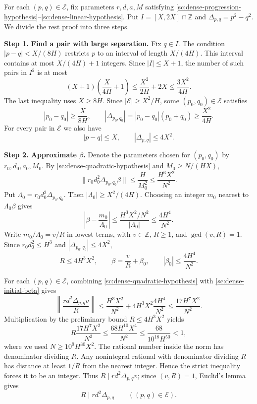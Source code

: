 \documentclass[twoside]{aomart}
\makeatletter
\theoremstyle{paperplain}
\theoremstyle{paperdefinition}
\renewenvironment{proof}[1][\proofname]{\par\pushQED{\qed}%
  \normalfont\topsep6\p@\@plus3\p@\relax\trivlist
  \item[\hskip\labelsep\itshape #1\@addpunct{.}]\ignorespaces
}{\popQED\endtrivlist\@endpefalse}
\numberwithin{equation}{section}
\makeatother
\begin{document}
\begin{proof}
For each $(p,q)\in\mathcal E$, fix parameters $r,d,a,M$ satisfying
\eqref{sc:dense-progression-hypothesis}--\eqref{sc:dense-linear-hypothesis}.
Put $I=[X,2X]\cap\mathbb Z$ and $\Delta_{p,q}=p^2-q^2$. We divide the rest proof into three steps.

\par
\medskip
\noindent\textbf{Step 1. Find a pair with large separation.}
Fix $q\in I$. The condition $|p-q|<X/(8H)$ restricts $p$ to an
interval of length $X/(4H)$. This interval contains at most
$X/(4H)+1$ integers. Since $|I|\le X+1$, the number of such pairs
in $I^2$ is at most
\[
 (X+1)\left(\frac X{4H}+1\right)
 \le \frac{X^2}{2H}+2X
 \le \frac{3X^2}{4H}.
\]
The last inequality uses $X\ge8H$. Since
$|\mathcal E|\ge X^2/H$, some $(p_0,q_0)\in\mathcal E$ satisfies
\begin{equation}
 |p_0-q_0|\ge\frac{X}{8H},
 \qquad
 |\Delta_{p_0,q_0}|
 =|p_0-q_0|(p_0+q_0)\ge\frac{X^2}{4H}.
 \label{sc:dense-far-pair}
\end{equation}
For every pair in $\mathcal E$ we also have
\[
 |p-q|\le X,
 \qquad
 |\Delta_{p,q}|\le4X^2.
\]

\par
\medskip
\noindent\textbf{Step 2. Approximate $\beta$.}
Denote the parameters chosen for $(p_0,q_0)$ by
$r_0,d_0,a_0,M_0$. By \eqref{sc:dense-quadratic-hypothesis} and
$M_0\ge N/(HX)$,
\[
 \|r_0d_0^2\Delta_{p_0,q_0}\beta\|
 \le \frac{H}{M_0^2}
 \le \frac{H^3X^2}{N^2}.
\]
Put
$\Lambda_0=r_0d_0^2\Delta_{p_0,q_0}$. Then
$|\Lambda_0|\ge X^2/(4H)$. Choosing an integer $m_0$ nearest to
$\Lambda_0\beta$ gives
\[
 \left|\beta-\frac{m_0}{\Lambda_0}\right|
 \le \frac{H^3X^2/N^2}{|\Lambda_0|}
 \le \frac{4H^4}{N^2}.
\]
Write $m_0/\Lambda_0=v/R$ in lowest terms, with $v\in\mathbb Z$,
$R\ge1$, and $\gcd(v,R)=1$. Since $r_0d_0^2\le H^3$ and
$|\Delta_{p_0,q_0}|\le4X^2$,
\begin{equation}
 R\le4H^3X^2,
 \qquad
 \beta=\frac vR+\beta_0,
 \qquad
 |\beta_0|\le\frac{4H^4}{N^2}.
 \label{sc:dense-initial-beta}
\end{equation}

For each $(p,q)\in\mathcal E$, combining
\eqref{sc:dense-quadratic-hypothesis} with
\eqref{sc:dense-initial-beta} gives
\[
 \left\|\frac{rd^2\Delta_{p,q}v}{R}\right\|
 \le \frac{H^3X^2}{N^2}
      +4H^3X^2\frac{4H^4}{N^2}
 \le \frac{17H^7X^2}{N^2}.
\]
Multiplication by the preliminary bound $R\le4H^3X^2$ yields
\[
 R\frac{17H^7X^2}{N^2}
 \le \frac{68H^{10}X^4}{N^2}
 \le \frac{68}{10^{18}H^{50}}<1,
\]
where we used $N\ge10^9H^{30}X^2$. The rational number inside the norm has
denominator dividing $R$. Any nonintegral rational with denominator
dividing $R$ has distance at least $1/R$ from the nearest integer.
Hence the strict inequality forces it to be an integer. Thus
$R\mid rd^2\Delta_{p,q}v$; since $(v,R)=1$, Euclid's lemma gives
\begin{equation*}
 R\mid rd^2\Delta_{p,q}
 \qquad ((p,q)\in\mathcal E).
\end{equation*}


\end{proof}
\end{document}
